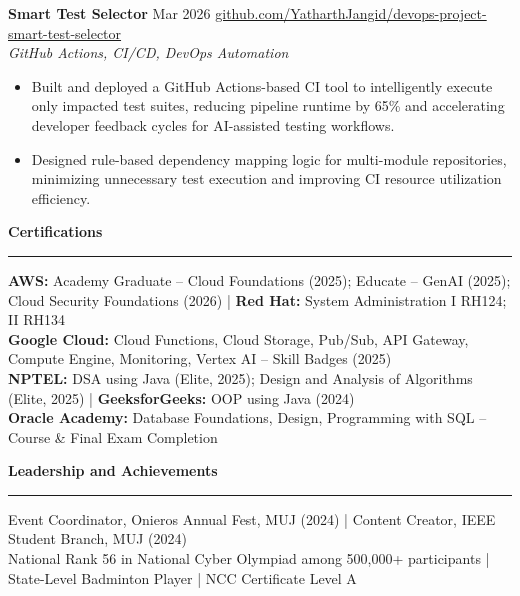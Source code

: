\documentclass[10pt,a4paper]{article}
\newcommand{\ressection}[1]{%
  \vspace{3pt}%
  {\bfseries\normalsize #1}%
  \vspace{1pt}\hrule\vspace{2pt}%
}
\begin{document}
\textbf{Smart Test Selector} \hfill Mar 2026 \hfill
\href{https://github.com/YatharthJangid/devops-project-smart-test-selector}%
     {\small github.com/YatharthJangid/devops-project-smart-test-selector} \\
\textit{GitHub Actions, CI/CD, DevOps Automation}
\begin{itemize}
  \item Built and deployed a GitHub Actions-based CI tool to intelligently execute only impacted test suites,
        reducing pipeline runtime by 65\% and accelerating developer feedback cycles for
        AI-assisted testing workflows.
  \item Designed rule-based dependency mapping logic for multi-module repositories,
        minimizing unnecessary test execution and improving CI resource utilization efficiency.
\end{itemize}

\ressection{Certifications}
\textbf{AWS:} Academy Graduate -- Cloud Foundations (2025); Educate -- GenAI (2025);
  Cloud Security Foundations (2026) \;|\;
\textbf{Red Hat:} System Administration I RH124; II RH134 \\
\textbf{Google Cloud:} Cloud Functions, Cloud Storage, Pub/Sub, API Gateway, Compute Engine,
  Monitoring, Vertex AI -- Skill Badges (2025) \\
\textbf{NPTEL:} DSA using Java (Elite, 2025); Design and Analysis of Algorithms (Elite, 2025)
  \;|\; \textbf{GeeksforGeeks:} OOP using Java (2024) \\
\textbf{Oracle Academy:} Database Foundations, Design, Programming with SQL -- Course \& Final Exam Completion

\ressection{Leadership and Achievements}
Event Coordinator, Onieros Annual Fest, MUJ (2024) \;|\;
Content Creator, IEEE Student Branch, MUJ (2024) \\
National Rank 56 in National Cyber Olympiad among 500,000+ participants \;|\;
State-Level Badminton Player \;|\; NCC Certificate Level A
\end{document}
